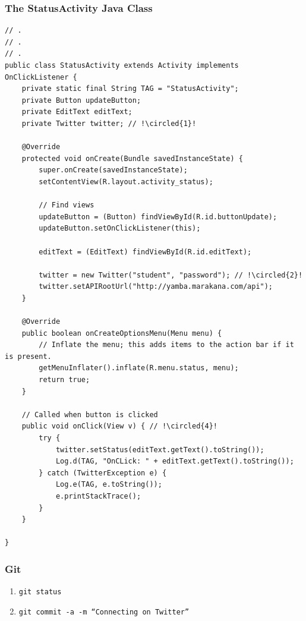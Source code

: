 \begin{frame}
\frametitle{The StatusActivity Java Class}
\lstset{language=java, style=eclipse, breaklines=true, tabsize=2}
\centering
\begin{lstlisting}[caption=src/com/artemisa/yamba/StatusActivity.java, basicstyle=\tiny, escapechar=!, ]
// .
// .
// .
public class StatusActivity extends Activity implements OnClickListener {
	private static final String TAG = "StatusActivity";
	private Button updateButton;
	private EditText editText;
	private Twitter twitter; // !\circled{1}!

	@Override
	protected void onCreate(Bundle savedInstanceState) {
		super.onCreate(savedInstanceState);
		setContentView(R.layout.activity_status);
	
		// Find views
		updateButton = (Button) findViewById(R.id.buttonUpdate);
		updateButton.setOnClickListener(this);
	
		editText = (EditText) findViewById(R.id.editText);
	
		twitter = new Twitter("student", "password"); // !\circled{2}!
		twitter.setAPIRootUrl("http://yamba.marakana.com/api");
	}

	@Override
	public boolean onCreateOptionsMenu(Menu menu) {
		// Inflate the menu; this adds items to the action bar if it is present.
		getMenuInflater().inflate(R.menu.status, menu);
		return true;
	}

	// Called when button is clicked
	public void onClick(View v) { // !\circled{4}!
		try {
			twitter.setStatus(editText.getText().toString());
			Log.d(TAG, "OnCLick: " + editText.getText().toString());
		} catch (TwitterException e) {
			Log.e(TAG, e.toString());
			e.printStackTrace();
		}
	}

}

\end{lstlisting}
\end{frame}


\begin{frame}[fragile]
\frametitle{Git}
\begin{enumerate}
\item \texttt{git status}
\item \texttt{git commit -a -m ``Connecting on Twitter''}

\end{enumerate}

\end{frame}
